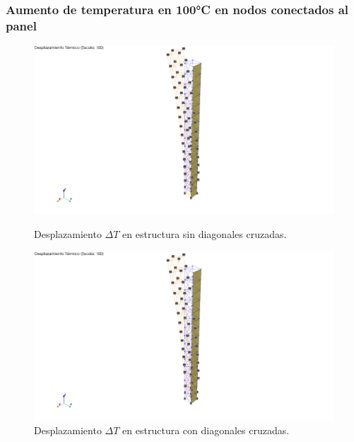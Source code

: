 \subsubsection{Aumento de temperatura en 100°C en nodos conectados al panel}

\begin{figure}[H]
    \centering
    \begin{minipage}{0.45\textwidth}
        \centering
        \includegraphics[width=\textwidth]{GRAFICOS/Desplazamientos Termicos False.png}
        \caption{Desplazamiento $\Delta T$ en estructura sin diagonales cruzadas.}
        \label{fig:imagen7}
    \end{minipage}
    \hfill
    \begin{minipage}{0.45\textwidth}
        \centering
        \includegraphics[width=\textwidth]{GRAFICOS/Desplazamientos Termicos True.png}
        \caption{Desplazamiento $\Delta T$ en estructura con diagonales cruzadas.}
        \label{fig:imagen8}
    \end{minipage}
\end{figure}

